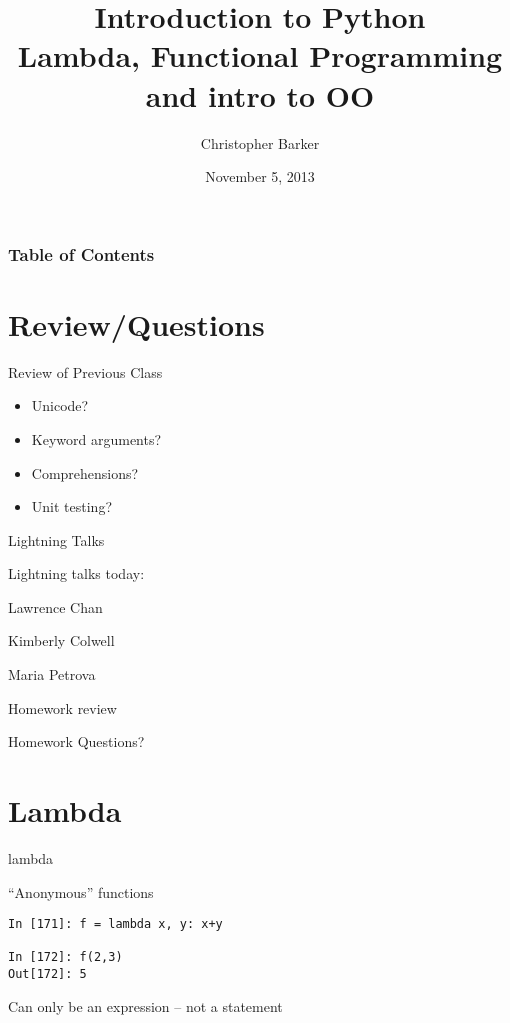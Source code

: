 \documentclass{beamer}
\title[Intro to Python: Week 1]{Introduction  to Python\\
Lambda, Functional Programming and intro to OO}
\author{Christopher Barker}
\institute{UW Continuing Education}
\date{November 5, 2013}
\begin{document}
\begin{frame}
  \titlepage
\end{frame}

\begin{frame}
\frametitle{Table of Contents}
  \tableofcontents
\end{frame}


\section{Review/Questions}

\begin{frame}{Review of Previous Class}

\begin{itemize}
  \item Unicode?
  \item Keyword arguments?
  \item Comprehensions?
  \item Unit testing?
\end{itemize}

\end{frame}


\begin{frame}{Lightning Talks}

\vfill
{\LARGE Lightning talks today:}

\vfill
{\Large
Lawrence Chan

\vfill
Kimberly Colwell

\vfill
Maria Petrova


}
\vfill

\end{frame}


\begin{frame}{Homework review}

  \vfill
  {\Large Homework Questions? }

  \vfill

\end{frame}

\section{Lambda}

\begin{frame}[fragile]{lambda}

{\Large``Anonymous'' functions}

\vfill
\begin{verbatim}
In [171]: f = lambda x, y: x+y

In [172]: f(2,3)
Out[172]: 5
\end{verbatim}

\vfill
{\Large Can only be an expression -- not a statement}

\end{frame} 
\end{document}
